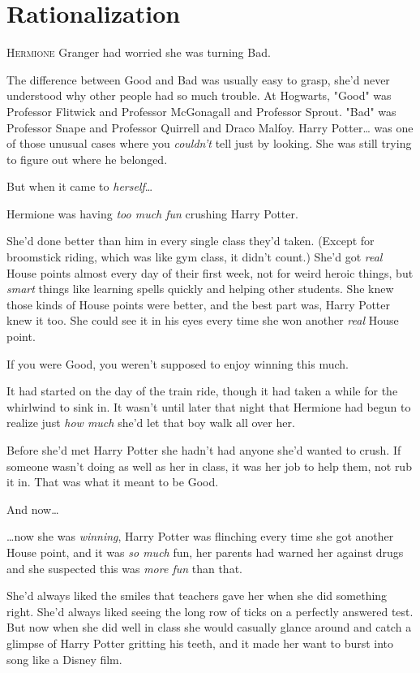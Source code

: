 \chapter{Rationalization}

\lettrine{H}{ermione} Granger had worried she was turning Bad.

The difference between Good and Bad was usually easy to grasp, she'd never
understood why other people had so much trouble. At Hogwarts, "Good" was
Professor Flitwick and Professor McGonagall and Professor Sprout. "Bad" was
Professor Snape and Professor Quirrell and Draco Malfoy. Harry Potter{\ldots}
was one of those unusual cases where you \emph{couldn't} tell just by looking.
She was still trying to figure out where he belonged.

But when it came to \emph{herself}{\ldots}

Hermione was having \emph{too much fun} crushing Harry Potter.

She'd done better than him in every single class they'd taken. (Except for
broomstick riding, which was like gym class, it didn't count.) She'd got
\emph{real} House points almost every day of their first week, not for weird
heroic things, but \emph{smart} things like learning spells quickly and helping
other students. She knew those kinds of House points were better, and the best
part was, Harry Potter knew it too. She could see it in his eyes every time she
won another \emph{real} House point.

If you were Good, you weren't supposed to enjoy winning this much.

It had started on the day of the train ride, though it had taken a while for
the whirlwind to sink in. It wasn't until later that night that Hermione had
begun to realize just \emph{how much} she'd let that boy walk all over her.

Before she'd met Harry Potter she hadn't had anyone she'd wanted to crush. If
someone wasn't doing as well as her in class, it was her job to help them, not
rub it in. That was what it meant to be Good.

And now{\ldots}

{\ldots}now she was \emph{winning}, Harry Potter was flinching every time she
got another House point, and it was \emph{so much} fun, her parents had warned
her against drugs and she suspected this was \emph{more fun} than that.

She'd always liked the smiles that teachers gave her when she did something
right. She'd always liked seeing the long row of ticks on a perfectly
answered test. But now when she did well in class she would casually glance
around and catch a glimpse of Harry Potter gritting his teeth, and it made her
want to burst into song like a Disney film.

